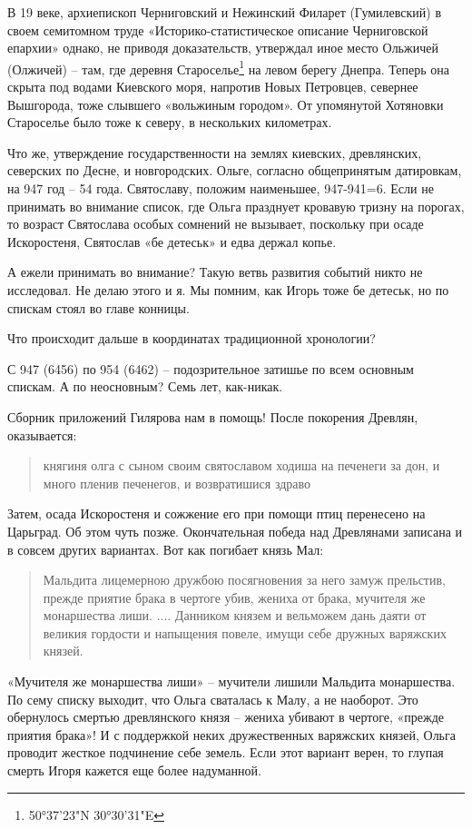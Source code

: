 В 19 веке, архиепископ Черниговский и Нежинский Филарет (Гумилевский) в своем семитомном труде «Исто\-рико-статистическое описание Черниговской епархии» однако, не приводя доказательств, утверждал иное место Ольжичей (Олжичей) – там, где деревня Староселье\footnote{50°37'23"N 30°30'31"E} на левом берегу Днепра. Теперь она скрыта под водами Киевского моря, напротив Новых Петровцев, севернее Вышгорода, тоже слывшего «вольжиным городом». От упомянутой Хотяновки Староселье было тоже к северу, в нескольких километрах.

Что же, утверждение государственности на землях киевских, древлянских, северских по Десне, и новгородских. Ольге, согласно общепринятым датировкам, на 947 год – 54 года. Святославу, положим наименьшее, 947-941=6. Если не принимать во внимание список, где Ольга празднует кровавую тризну на порогах, то возраст Святослава особых сомнений не вызывает, поскольку при осаде Искоростеня, Святослав «бе детеськ» и едва держал копье. 

А ежели принимать во внимание? Такую ветвь развития событий никто не исследовал. Не делаю этого и я. Мы помним, как Игорь тоже бе детеськ, но по спискам стоял во главе конницы.

Что происходит дальше в координатах традиционной хронологии?

С 947 (6456) по 954 (6462) – подозрительное затишье по всем основным спискам. А по неосновным? Семь лет, как-никак.

Сборник приложений Гилярова нам в помощь! После покорения Древлян, оказывается:

\begin{quotation}
княгиня олга с сыном своим святославом ходиша на печенеги за дон, и много пленив печенегов, и возвратишися здраво
\end{quotation}

Затем, осада Искоростеня и сожжение его при помощи птиц перенесено на Царьград. Об этом чуть позже. Окончательная победа над Древлянами записана и в совсем других вариантах. Вот как погибает князь Мал:

\begin{quotation}
Мальдита лицемерною дружбою посягновения за него замуж прельстив, прежде приятие брака в чертоге убив, жениха от брака, мучителя же монаршества лиши. .... Данником князем и вельможем дань даяти от великия гордости и напыщения повеле, имущи себе дружных варяжских князей.
\end{quotation}

«Мучителя же монаршества лиши» – мучители лишили Мальдита монаршества. По сему списку выходит, что Ольга сваталась к Малу, а не наоборот. Это обернулось смертью древлянского князя – жениха убивают в чертоге, «прежде приятия брака»! И с поддержкой неких дружественных варяжских князей, Ольга проводит жесткое подчинение себе земель. Если этот вариант верен, то глупая смерть Игоря кажется еще более надуманной.

